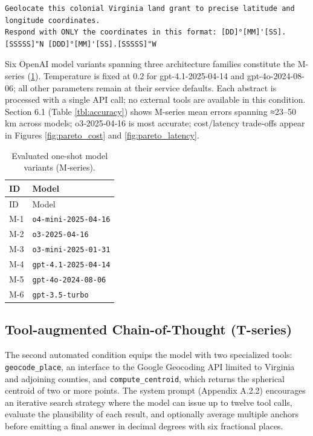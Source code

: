 \begin{lstlisting}
Geolocate this colonial Virginia land grant to precise latitude and longitude coordinates.
Respond with ONLY the coordinates in this format: [DD]°[MM]'[SS].[SSSSS]"N [DDD]°[MM]'[SS].[SSSSS]"W
\end{lstlisting}

Six OpenAI model variants spanning three architecture families
constitute the M-series (\ref{tbl:mmodels}). Temperature is fixed at 0.2
for gpt-4.1-2025-04-14 and gpt-4o-2024-08-06; all other parameters
remain at their service defaults. Each abstract is processed with a
single API call; no external tools are available in this condition.
Section 6.1 (Table \ref{tbl:accuracy}) shows M-series mean errors
spanning ≈23--50 km across models; o3‑2025‑04‑16 is most accurate;
cost/latency trade‑offs appear in Figures \ref{fig:pareto_cost} and
\ref{fig:pareto_latency}.

\begin{longtable}[]{@{}ll@{}}
\caption{\label{tbl:mmodels}Evaluated one-shot model variants
(M‑series).}\tabularnewline
\toprule\noalign{}
ID & Model \\
\midrule\noalign{}
\endfirsthead
\toprule\noalign{}
ID & Model \\
\midrule\noalign{}
\endhead
\bottomrule\noalign{}
\endlastfoot
M-1 & \passthrough{\lstinline!o4-mini-2025-04-16!} \\
M-2 & \passthrough{\lstinline!o3-2025-04-16!} \\
M-3 & \passthrough{\lstinline!o3-mini-2025-01-31!} \\
M-4 & \passthrough{\lstinline!gpt-4.1-2025-04-14!} \\
M-5 & \passthrough{\lstinline!gpt-4o-2024-08-06!} \\
M-6 & \passthrough{\lstinline!gpt-3.5-turbo!} \\
\end{longtable}

\subsection{Tool-augmented Chain-of-Thought
(T-series)}\label{tool-augmented-chain-of-thought-t-series}

The second automated condition equips the model with two specialized
tools: \texttt{geocode\_place}, an interface to the Google Geocoding API
limited to Virginia and adjoining counties, and
\texttt{compute\_centroid}, which returns the spherical centroid of two
or more points. The system prompt (Appendix A.2.2) encourages an
iterative search strategy where the model can issue up to twelve tool
calls, evaluate the plausibility of each result, and optionally average
multiple anchors before emitting a final answer in decimal degrees with
six fractional places.

